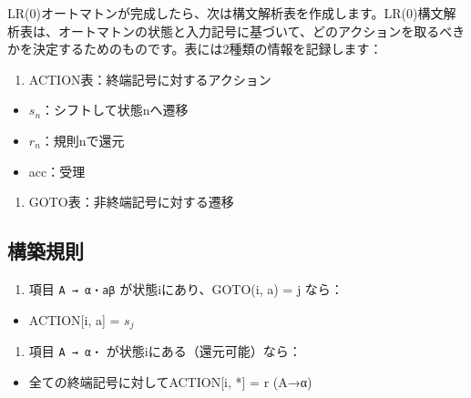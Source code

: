 LR(0)オートマトンが完成したら、次は構文解析表を作成します。LR(0)構文解析表は、オートマトンの状態と入力記号に基づいて、どのアクションを取るべきかを決定するためのものです。表には2種類の情報を記録します：

\begin{enumerate}
\def\labelenumi{\arabic{enumi}.}
\tightlist
\item
  ACTION表：終端記号に対するアクション
\end{enumerate}

\begin{itemize}
\tightlist
\item
  \(s_n\)：シフトして状態nへ遷移
\item
  \(r_n\)：規則nで還元
\item
  acc：受理
\end{itemize}

\begin{enumerate}
\def\labelenumi{\arabic{enumi}.}
\setcounter{enumi}{1}
\tightlist
\item
  GOTO表：非終端記号に対する遷移
\end{enumerate}

\hypertarget{chapter5-ux69cbux7bc9ux898fux5247}{%
\subsection{構築規則}\label{chapter5-ux69cbux7bc9ux898fux5247}}

\begin{enumerate}
\def\labelenumi{\arabic{enumi}.}
\tightlist
\item
  項目 \texttt{A\ →\ α・aβ} が状態iにあり、GOTO(i, a) = j なら：
\end{enumerate}

\begin{itemize}
\tightlist
\item
  ACTION{[}i, a{]} = \(s_j\)
\end{itemize}

\begin{enumerate}
\def\labelenumi{\arabic{enumi}.}
\setcounter{enumi}{1}
\tightlist
\item
  項目 \texttt{A\ →\ α・} が状態iにある（還元可能）なら：
\end{enumerate}

\begin{itemize}
\tightlist
\item
  全ての終端記号に対してACTION{[}i, *{]} = r (A→α)
\end{itemize}

